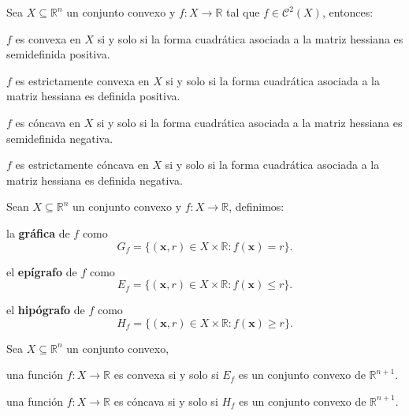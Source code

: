 \documentclass[8pt,a4paper]{extarticle}
\begin{document}
\begin{multicols}{3}
	\sectionbreak

	\begin{boxtheo}
		Sea $X \subseteq \mathbb{R}^n$ un conjunto convexo y $f : X \to \mathbb{R}$ tal que $f \in \mathcal{C}^2(X)$, entonces:
		\begin{eqlist}
			\item $f$ es convexa en $X$ si y solo si la forma cuadrática asociada a la matriz hessiana es semidefinida positiva.
			\item $f$ es estrictamente convexa en $X$ si y solo si la forma cuadrática asociada a la matriz hessiana es definida positiva.
			\item $f$ es cóncava en $X$ si y solo si la forma cuadrática asociada a la matriz hessiana es semidefinida negativa.
			\item $f$ es estrictamente cóncava en $X$ si y solo si la forma cuadrática asociada a la matriz hessiana es definida negativa.
		\end{eqlist}
	\end{boxtheo}

	\begin{boxdef}
		Sean $X \subseteq \mathbb{R}^n$ un conjunto convexo y $f : X \to \mathbb{R}$, definimos:
		\begin{bulletlist}
			\item la \textbf{gráfica} de $f$ como $$G_f = \{ (\mathbf{x}, r) \in X \times \mathbb{R} : f(\mathbf{x}) = r \} .$$
			\item el \textbf{epígrafo} de $f$ como $$E_f = \{ (\mathbf{x}, r) \in X \times \mathbb{R} : f(\mathbf{x}) \le r \} .$$
			\item el \textbf{hipógrafo} de $f$ como $$H_f = \{ (\mathbf{x}, r) \in X \times \mathbb{R} : f(\mathbf{x}) \ge r \} .$$
		\end{bulletlist}
	\end{boxdef}

	\begin{boxtheo}
		Sea $X \subseteq \mathbb{R}^n$ un conjunto convexo,
		\begin{eqlist}
			\item una función $f : X \to \mathbb{R}$ es convexa si y solo si $E_f$ es un conjunto convexo de $\mathbb{R}^{n+1}$.
			\item una función $f : X \to \mathbb{R}$ es cóncava si y solo si $H_f$ es un conjunto convexo de $\mathbb{R}^{n+1}$.
		\end{eqlist}
	\end{boxtheo}


\end{multicols}
\end{document}
